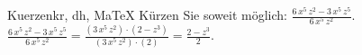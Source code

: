 \begin{MAufgabe}{Kuerzen}{kr, dh, MaTeX}
K\"urzen Sie soweit m\"oglich: $\frac{6\, x^5\, z^2 - 3\, x^5\, z^5}{6\, x^5\, z^2}$.\\ 
\ifLsg\MLoesung
\quad $\frac{6\, x^5\, z^2 - 3\, x^5\, z^5}{6\, x^5\, z^2}=\frac{(3\, x^5\, z^2)\cdot(2 - z^3)}{(3\, x^5\, z^2)\cdot(2)}=\frac{2 - z^3}{2}$.\else\relax\fi
 \end{MAufgabe}